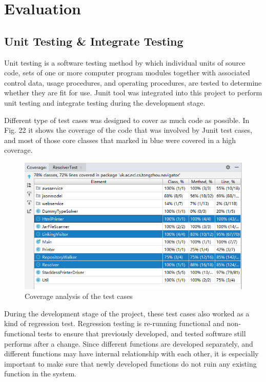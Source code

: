 \documentclass[runningheads]{llncs}
\begin{document}
\section{Evaluation}

\subsection{Unit Testing \& Integrate Testing}

Unit testing is a software testing method by which individual units of source code, sets of one or more computer program modules together with associated control data, usage procedures, and operating procedures, are tested to determine whether they are fit for use.\cite{huizinga2007automated} Junit tool was integrated into this project to perform unit testing and integrate testing during the development stage.

Different type of test cases was designed to cover as much code as possible. In Fig. 22 it shows the coverage of the code that was involved by Junit test cases, and most of those core classes that marked in blue were covered in a high coverage.

\begin{figure}[H]
	\centering
	\includegraphics[width=12cm]{pic/unit-test-coverage.png}
	\caption{Coverage analysis of the test cases}
	\label{Coverage analysis of the test cases}
\end{figure}

During the development stage of the project, these test cases also worked as a kind of regression test. Regression testing is re-running functional and non-functional tests to ensure that previously developed, and tested software still performs after a change.\cite{basu2015software} Since different functions are developed separately, and different functions may have internal relationship with each other, it is especially important to make sure that newly developed functions do not ruin any existing function in the system.
\end{document}

